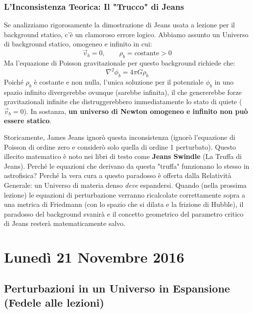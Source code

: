 \documentclass[11pt,a4paper]{report}
\begin{document}
\subsection{L'Inconsistenza Teorica: Il "Trucco" di Jeans}
Se analizziamo rigorosamente la dimostrazione di Jeans usata a lezione per il background statico, c'è un clamoroso errore logico.
Abbiamo assunto un Universo di background statico, omogeneo e infinito in cui:
\begin{equation}
\vec{v}_b = 0, \qquad \rho_b = \text{costante} > 0
\end{equation}
Ma l'equazione di Poisson gravitazionale per questo background richiede che:
\begin{equation}
\nabla^2 \phi_b = 4\pi G \rho_b
\end{equation}
Poiché $\rho_b$ è costante e non nulla, l'unica soluzione per il potenziale $\phi_b$ in uno spazio infinito divergerebbe ovunque (sarebbe infinita), il che genererebbe forze gravitazionali infinite che distruggerebbero immediatamente lo stato di quiete ($\vec{v}_b = 0$). In sostanza, \textbf{un universo di Newton omogeneo e infinito non può essere statico}.

Storicamente, James Jeans ignorò questa inconsistenza (ignorò l'equazione di Poisson di ordine zero e considerò solo quella di ordine 1 perturbato). Questo illecito matematico è noto nei libri di testo come \textbf{Jeans Swindle} (La Truffa di Jeans).
Perché le equazioni che derivano da questa "truffa" funzionano lo stesso in astrofisica? Perché la vera cura a questo paradosso è offerta dalla Relatività Generale: un Universo di materia denso \textit{deve} espandersi. Quando (nella prossima lezione) le equazioni di perturbazione verranno ricalcolate correttamente sopra a una metrica di Friedmann (con lo spazio che si dilata e la frizione di Hubble), il paradosso del background svanirà e il concetto geometrico del parametro critico di Jeans resterà matematicamente salvo.

\chapter{Lunedì 21 Novembre 2016}

\section{Perturbazioni in un Universo in Espansione (Fedele alle lezioni)}
\end{document}
